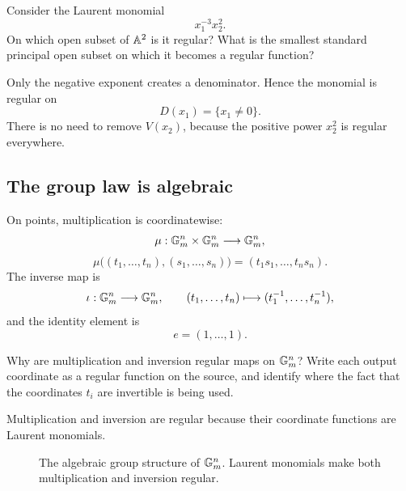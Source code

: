 \begin{pauseandthink}
Consider the Laurent monomial
\[
x_1^{-3}x_2^2.
\]
On which open subset of \(\mathbb{A}^2\) is it regular? What is the smallest
standard principal open subset on which it becomes a regular function?
\end{pauseandthink}

Only the negative exponent creates a denominator. Hence the monomial
is regular on
\[
D(x_1)=\{x_1\neq0\}.
\]
There is no need to remove \(V(x_2)\), because the positive power
\(x_2^2\) is regular everywhere.

\subsection{The group law is algebraic}

On points, multiplication is coordinatewise:
\[
\mu:\mathbb{G}_{m}^n\times\mathbb{G}_{m}^n\longrightarrow\mathbb{G}_{m}^n,
\]
\[
\mu\bigl((t_1,\ldots,t_n),(s_1,\ldots,s_n)\bigr)
=
(t_1s_1,\ldots,t_ns_n).
\]
The inverse map is
\[
\iota:\mathbb{G}_{m}^n\longrightarrow\mathbb{G}_{m}^n,
\qquad
(t_1,\ldots,t_n)
\longmapsto
(t_1^{-1},\ldots,t_n^{-1}),
\]
and the identity element is
\[
e=(1,\ldots,1).
\]

\begin{pauseandthink}
Why are multiplication and inversion regular maps on \(\mathbb{G}_{m}^n\)?
Write each output coordinate as a regular function on the source, and
identify where the fact that the coordinates \(t_i\) are invertible is
being used.
\end{pauseandthink}

Multiplication and inversion are regular because their coordinate
functions are Laurent monomials.

\begin{figure}[ht]
\centering
{}
\caption{The algebraic group structure of \(\mathbb{G}_{m}^n\). Laurent monomials
make both multiplication and inversion regular.}
\label{fig:gm-group-operations}
\end{figure}

